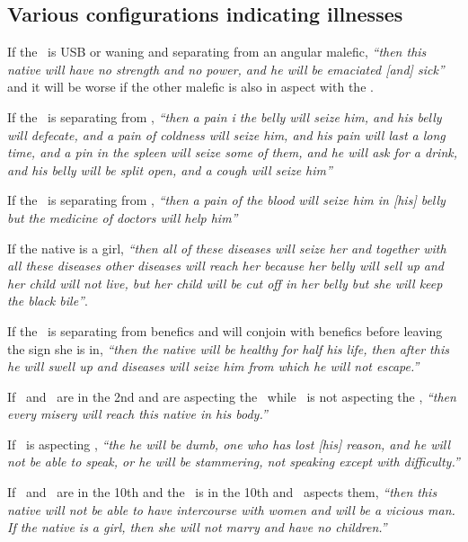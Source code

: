 \subsection{Various configurations indicating illnesses}

If  the \Moon\, is USB or waning and separating from an angular malefic, \textsl{``then this native will have no strength and no power, and he will be emaciated [and] sick''} and it will be worse if the other malefic is also in aspect with the \Moon.

If  the \Moon\, is separating from \Saturn, \textsl{``then a pain i the belly will seize him, and his belly will defecate, and a pain of coldness will seize him, and his pain will last a long time, and a pin in the spleen will seize some of them, and he will ask for a drink, and his belly will be split open, and a cough will seize him''} 

If  the \Moon\, is separating from \Mars, \textsl{``then a pain of the blood will seize him in [his] belly but the medicine of doctors will help him''}

If  the native is a girl, \textsl{``then all of these diseases will seize her and together with all these diseases other diseases will reach her because her belly will sell up and her child will not live, but her child will be cut off in her belly but she will keep the black bile''}.

If  the \Moon\, is separating from benefics and will conjoin with benefics before leaving the sign she is in, \textsl{``then the native will be healthy for half his life, then after this he will swell up and diseases will seize him from which he will not escape.''}

If  \Saturn\, and \Mars\, are in the 2nd and are aspecting the \Moon\, while \Jupiter\, is not aspecting the \Moon, \textsl{``then every misery will reach this native in his body.''}

If  \Saturn\, is aspecting \Mercury, \textsl{``the he will be dumb, one who has lost [his] reason, and he will not be able to speak, or he will be stammering, not speaking except with difficulty.''}

If  \Saturn\, and \Venus\, are in the 10th and the \Moon\, is in the 10th and \Mars\, aspects them, \textsl{``then this native will not be able to have intercourse with women and will be a vicious man. If the native is a girl, then she will not marry and have no children.''}

